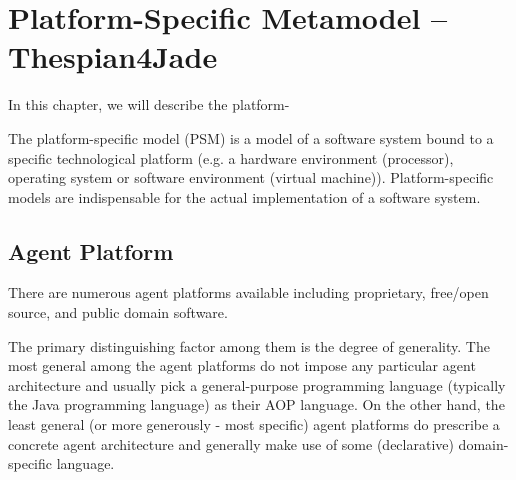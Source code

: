 
\chapter{Platform-Specific Metamodel -- Thespian4Jade}

In this chapter, we will describe the platform-

The platform-specific model (PSM) is a model of a software system bound to a specific technological platform (e.g. a hardware environment (processor), operating system or software environment (virtual machine)).
Platform-specific models are indispensable for the actual implementation of a software system.

\section{Agent Platform}

There are numerous agent platforms available including proprietary, free/open source, and public domain software.

The primary distinguishing factor among them is the degree of generality.
The most general among the agent platforms do not impose any particular agent architecture and usually pick a general-purpose programming language (typically the Java programming language) as their AOP language.
On the other hand, the least general (or more generously - most specific) agent platforms do prescribe a concrete agent architecture and generally make use of some (declarative) domain-specific language.

